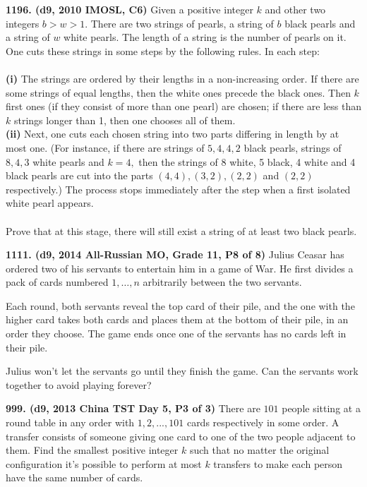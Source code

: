 \documentclass{article}
\begin{document}
\textbf{1196. (\color{red}d9\color{black}, 2010 IMOSL, C6)} Given a positive integer $k$ and other two integers $b > w > 1.$ There are two strings of pearls, a string of $b$ black pearls and a string of $w$ white pearls. The length of a string is the number of pearls on it. One cuts these strings in some steps by the following rules. In each step: \\\\
\textbf{(i)} The strings are ordered by their lengths in a non-increasing order. If there are some strings of equal lengths, then the white ones precede the black ones. Then $k$ first ones (if they consist of more than one pearl) are chosen; if there are less than $k$ strings longer than 1, then one chooses all of them. \\
\textbf{(ii)} Next, one cuts each chosen string into two parts differing in length by at most one. (For instance, if there are strings of $5, 4, 4, 2$ black pearls, strings of $8, 4, 3$ white pearls and $k = 4,$ then the strings of 8 white, 5 black, 4 white and 4 black pearls are cut into the parts $(4,4), (3,2), (2,2)$ and $(2,2)$ respectively.) The process stops immediately after the step when a first isolated white pearl appears. \\\\
Prove that at this stage, there will still exist a string of at least two black pearls.


\textbf{1111. (\color{red}d9\color{black}, 2014 All-Russian MO, Grade 11, P8 of 8)} Julius Ceasar has ordered two of his servants to entertain him in a game of War. He first divides a pack of cards numbered $1,\ldots,n$ arbitrarily between the two servants.

\makebox[1.5em]{}Each round, both servants reveal the top card of their pile, and the one with the higher card takes both cards and places them at the bottom of their pile, in an order they choose. The game ends once one of the servants has no cards left in their pile.

\makebox[1.5em]{}Julius won't let the servants go until they finish the game. Can the servants work together to avoid playing forever?

\textbf{999. (\color{red}d9\color{black}, 2013 China TST Day 5, P3 of 3)} There are $101$ people sitting at a round table in any order with $1,2,... , 101$ cards respectively in some order. A transfer consists of someone giving one card to one of the two people adjacent to them. Find the smallest positive integer $k$ such that no matter the original configuration it's possible to perform at most $k$ transfers to make each person have the same number of cards.
\end{document}
